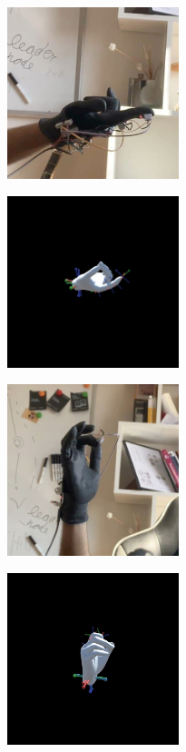 \begin{figure}
 \centering
 \begin{subfigure}[ht]{0.3\textwidth}
     \centering
     \includegraphics[width=5cm,height=5cm]{immagini/confronto/7_real.jpg}
     \caption{}
 \end{subfigure}
 \begin{subfigure}[ht]{0.3\textwidth}
     \includegraphics[width=5cm,height=5cm]{immagini/confronto/7_sym.jpg}
     \caption{}
 \end{subfigure}
 \caption{}
\end{figure}

\begin{figure}
 \centering
 \begin{subfigure}[ht]{0.3\textwidth}
     \centering
     \includegraphics[width=5cm,height=5cm]{immagini/confronto/8_real.jpg}
     \caption{}
 \end{subfigure}
 \begin{subfigure}[ht]{0.3\textwidth}
     \includegraphics[width=5cm,height=5cm]{immagini/confronto/8_sym.jpg}
     \caption{}
 \end{subfigure}
 \caption{}
\end{figure}


\clearpage
